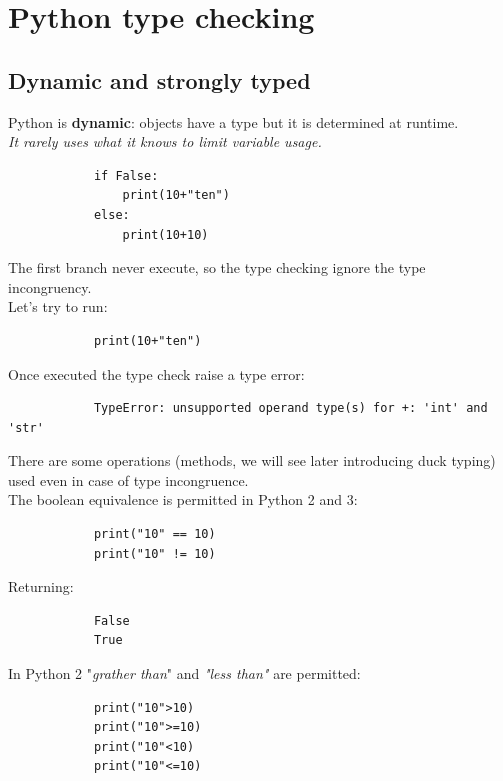 \documentclass[12pt]{article}
\begin{document}
\section{Python type checking}
	\subsection{Dynamic and strongly typed}
		Python is \textbf{dynamic}: objects have a type but it is determined at runtime. \\
		\textit{It rarely uses what it knows to limit variable usage.}
		
		\begin{lstlisting}
			if False:
				print(10+"ten") 
			else:
				print(10+10)
		\end{lstlisting}
		
		The first branch never execute, so the type checking ignore the type incongruency.\\
		Let's try to run:
		
		\begin{lstlisting}
			print(10+"ten")
		\end{lstlisting}
		
		Once executed the type check raise a type error:
		
		\begin{lstlisting}
			TypeError: unsupported operand type(s) for +: 'int' and 'str'
		\end{lstlisting}
		
		There are some operations (methods, we will see later introducing duck typing) used even in case of type incongruence. \\
		The boolean equivalence is permitted in Python 2 and 3: 
		
		\begin{lstlisting}
			print("10" == 10)
			print("10" != 10)
		\end{lstlisting}
		
		Returning:
		
		\begin{lstlisting}
			False
			True
		\end{lstlisting}
		
		In Python 2 "\textit{grather than}" and \textit{"less than"} are permitted:
		
		\begin{lstlisting}
			print("10">10)
			print("10">=10)
			print("10"<10)
			print("10"<=10)
		\end{lstlisting}
		
\end{document}
